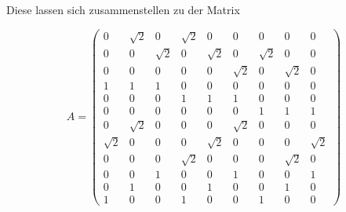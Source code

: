 \vspace{5pt}
Diese lassen sich zusammenstellen zu der Matrix 


\begin{equation}
    A =
    \begin{pmatrix}
        0 &         \sqrt{2} &  0 &         \sqrt{2} &  0 &         0 &         0 &         0 &         0           \\ 
        0 &         0 &         \sqrt{2} &  0 &         \sqrt{2} &  0 &         \sqrt{2} &  0 &         0           \\ 
        0 &         0 &         0 &         0 &         0 &         \sqrt{2} &  0 &         \sqrt{2} &  0           \\ 
        1 &         1 &         1 &         0 &         0 &         0 &         0 &         0 &         0           \\
        0 &         0 &         0 &         1 &         1 &         1 &         0 &         0 &         0           \\ 
        0 &         0 &         0 &         0 &         0 &         0 &         1 &         1 &         1           \\ 
        0 &         \sqrt{2} &  0 &         0 &         0 &         \sqrt{2} &  0 &         0 &         0           \\ 
        \sqrt{2} &  0 &         0 &         0 &         \sqrt{2} &  0 &         0 &         0 &         \sqrt{2}    \\ 
        0 &         0 &         0 &         \sqrt{2} &  0 &         0 &         0 &         \sqrt{2} &  0           \\ 
        0 &         0 &         1 &         0 &         0 &         1 &         0 &         0 &         1           \\ 
        0 &         1 &         0 &         0 &         1 &         0 &         0 &         1 &         0           \\ 
        1 &         0 &         0 &         1 &         0 &         0 &         1 &         0 &         0           
    \end{pmatrix}
\end{equation}

